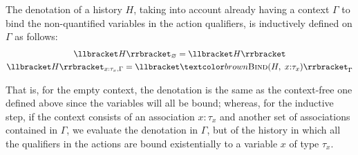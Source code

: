 \begin{definition}
    The denotation of a history $H$, taking into account already having a context $\Gamma$ to bind the non-quantified variables in the action qualifiers, is inductively defined on $\Gamma$ as follows:
    \begin{equation}
        \begin{gathered}
            {\llbracket H \rrbracket}_{\varnothing} = \llbracket H \rrbracket \\
            {\llbracket H \rrbracket}_{x: \tau_x,\Gamma} = {\llbracket \bind(H, \;x{:}\tau_x) \rrbracket}_{\Gamma}
        \end{gathered}
    \end{equation}
\end{definition}

That is, for the empty context, the denotation is the same as the context-free one defined above since the variables will all be bound; whereas, for the inductive step, if the context consists of an association $x:\tau_x$ and another set of associations contained in $\Gamma$, we evaluate the denotation in $\Gamma$, but of the history in which all the qualifiers in the actions are bound existentially to a variable $x$ of type $\tau_x$.

